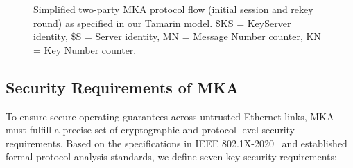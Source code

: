 \begin{figure}[htbp]
{%
}
\caption{Simplified two-party MKA protocol flow (initial session and rekey round) as specified in our Tamarin model. \$KS = KeyServer identity, \$S = Server identity, MN = Message Number counter, KN = Key Number counter.}
\label{fig:mka_flow}
\end{figure}

\subsection{Security Requirements of MKA}
\label{sec:requirements}

To ensure secure operating guarantees across untrusted Ethernet links, MKA must fulfill a precise set of cryptographic and protocol-level security requirements. Based on the specifications in IEEE 802.1X-2020~\cite{ieee8021x} and established formal protocol analysis standards, we define seven key security requirements:

